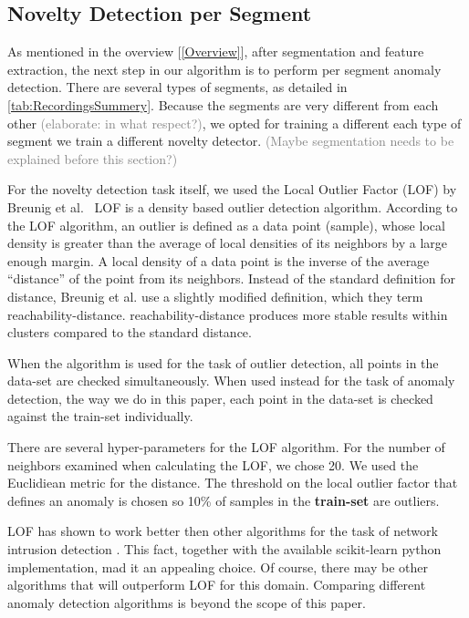 \documentclass[conference]{IEEEtran}
\begin{document}
\subsection{Novelty Detection per Segment}
  As mentioned in the overview [\ref{Overview}], after segmentation and feature  extraction, the next step in our algorithm is to perform per segment anomaly  detection. There are several types of segments, as detailed in \ref{tab:RecordingsSummery}. Because the segments are very different from each other \textcolor{gray}{(elaborate: in what respect?)}, we opted for training a different each type of segment we train a different novelty detector.
  \textcolor{gray}{(Maybe segmentation needs to be explained before this section?)}
  
  For the novelty detection task itself, we used the Local Outlier Factor (LOF) by Breunig et al.\ \cite{breunig2000lof} LOF is a density based outlier detection algorithm. According to the LOF algorithm, an outlier is defined as a data point (sample), whose local density is greater than the average of local densities of its neighbors by a large enough margin. A local density of a data point is the inverse of the average ``distance'' of the point from its neighbors. Instead of the standard definition for distance, Breunig et al. use a slightly modified definition, which they term reachability-distance. reachability-distance produces more stable results within clusters compared to the standard distance. 
  
  When the algorithm is used for the task of outlier detection, all points in the data-set are checked simultaneously.  When used instead for the task of anomaly detection, the way we do in this paper, each point in the data-set is checked against the train-set individually.
  
  There are several hyper-parameters for the LOF algorithm. For the number of neighbors examined when calculating the LOF, we chose 20. We used the Euclidiean metric for the distance. The threshold on the local outlier factor that defines an anomaly is chosen so 10\% of samples in the \textbf{train-set} are outliers.
  
  LOF has shown to work better then other algorithms for the task of network intrusion detection\cite{lazarevic2003comparative} . This fact, together with the available scikit-learn python implementation, mad it an appealing choice. Of course, there may be other algorithms that will outperform LOF for this domain. Comparing different anomaly detection algorithms is beyond the scope of this paper.
  
\end{document}
